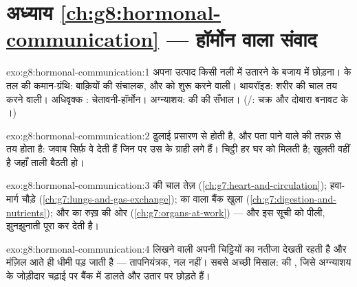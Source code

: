 \section*{अध्याय \ref{ch:g8:hormonal-communication} --- हॉर्मोन वाला संवाद}

\begin{solution}{exo:g8:hormonal-communication:1}
अपना उत्पाद किसी नली में उतारने के बजाय  में छोड़ना।  के तल
की कमान-ग्रंथि: बाक़ियों की संचालक, और  को शुरू करने वाली।
थायरॉइड: शरीर की चाल तय करने वाली। अधिवृक्क : चेतावनी-हॉर्मोन।
अग्न्याशय:  की  की सँभाल। (/: चक्र और दोबारा
बनावट के ।)
\end{solution}

\begin{solution}{exo:g8:hormonal-communication:2}
ढुलाई प्रसारण से होती है, और पता पाने वाले की तरफ़ से तय होता है: जवाब
सिर्फ़ वे  देती हैं जिन पर उस  के ग्राही लगे हैं। चिट्ठी
हर घर को मिलती है; खुलती वहीं है जहाँ ताली बैठती हो।
\end{solution}

\begin{solution}{exo:g8:hormonal-communication:3}
 की चाल तेज़ (\cref{ch:g7:heart-and-circulation}); हवा-मार्ग चौड़े
(\cref{ch:g7:lungs-and-gas-exchange});  का  वाला बैंक खुला
(\cref{ch:g7:digestion-and-nutrients}); और  का रुख़  की ओर
(\cref{ch:g7:organs-at-work}) --- और इस सूची को पीली, झुनझुनाती 
पूरा कर देती है।
\end{solution}

\begin{solution}{exo:g8:hormonal-communication:4}
लिखने वाली  अपनी चिट्ठियों का नतीजा देखती रहती है और मंज़िल आते ही
धीमी पड़ जाती है --- तापनियंत्रक, नल नहीं। सबसे अच्छी मिसाल:  की
, जिसे अग्न्याशय के जोड़ीदार  चढ़ाई पर बैंक में डालते और
उतार पर छोड़ते हैं।
\end{solution}

